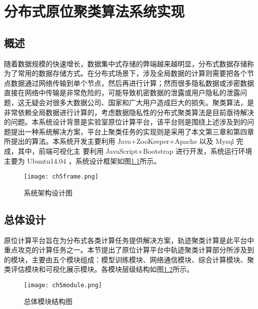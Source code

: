 \chapter{分布式原位聚类算法系统实现}

\section{概述}
随着数据规模的快速增长，数据集中式存储的弊端越来越明显，分布式数据存储称为了常用的数据存储方式。在分布式场景下，涉及全局数据的计算则需要把各个节点数据通过网络传输到单个节点，然后再进行计算；然而很多隐私数据或涉密数据直接在网络中传输是非常危险的，可能导致机密数据的泄露或用户隐私的泄露问题，这无疑会对很多大数据公司、国家和广大用户造成巨大的损失。聚类算法，是非常依赖全局数据进行计算的，考虑数据隐私性的分布式聚类算法是目前亟待解决的问题。本系统设计背景是实验室原位计算平台，该平台则是围绕上述涉及到的问题提出一种系统解决方案，平台上聚类任务的实现则是采用了本文第三章和第四章所提出的算法。本系统开发主要利用 Java+ZooKeeper+Apache 以及 Mysql 完成，其中，前端可视化主 要利用 JavaScript+Bootstrap 进行开发，系统运行环境主要为 Ubuntu14.04 ，系统设计框架如图\ref{ch5frame}所示。
\begin{figure}[h]
	\texttt{[image: ch5frame.png]}
	\caption{系统架构设计图}
	\label{ch5frame}
\end{figure}

\section{总体设计}
原位计算平台旨在为分布式各类计算任务提供解决方案，轨迹聚类计算是此平台中重点攻克的计算任务之一。本节提出了原位计算平台中轨迹聚类计算部分所涉及到的模块，主要由五个模块组成：模型训练模块、网络通信模块、综合计算模块、聚类评估模块和可视化展示模块。各模块层级结构如图\ref{ch5module}所示。
\begin{figure}[h]
	\texttt{[image: ch5module.png]}
	\caption{总体模块结构图}
	\label{ch5module}
\end{figure}

